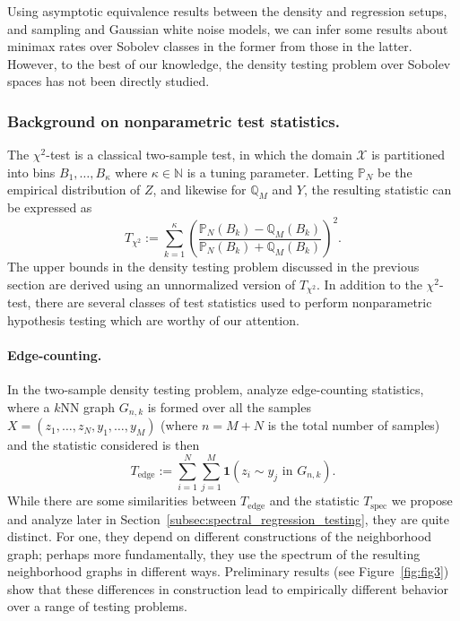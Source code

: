 \documentclass{article}
\newcommand{\1}{\mathbf{1}}
\theoremstyle{alden}
\theoremstyle{aldenthm}
\theoremstyle{definition}
\theoremstyle{remark}
\begin{document}
Using asymptotic equivalence results \citet{reiss08,nussbaum96,brown96} between the density and regression setups, and sampling and Gaussian white noise models, we can infer some results about minimax rates over Sobolev classes in the former from those in the latter. However, to the best of our knowledge, the density testing problem over Sobolev spaces has not been directly studied.

\subsubsection{Background on nonparametric test statistics.}

The $\chi^2$-test is a classical two-sample test, in which the domain $\mathcal{X}$ is partitioned into bins $B_1,\ldots,B_\kappa$ where $\kappa \in \mathbb{N}$ is a tuning parameter. Letting $\mathbb{P}_N$ be the empirical distribution of $Z$, and likewise for $\mathbb{Q}_M$ and $Y$, the resulting statistic can be expressed as 
\begin{equation}
\label{eqn:chi_squared}
T_{\chi^2} := \sum_{k = 1}^{\kappa} \left(\frac{\mathbb{P}_N(B_k) - \mathbb{Q}_M(B_k)}{\mathbb{P}_N(B_k) + \mathbb{Q}_M(B_k)}\right)^2.
\end{equation}
The upper bounds in the density testing problem discussed in the previous section are derived using an unnormalized version of $T_{\chi^2}$. In addition to the $\chi^2$-test, there are several classes of test statistics used to perform nonparametric hypothesis testing which are worthy of our attention.

\paragraph{Edge-counting.}
In the two-sample density testing problem, \citet{schilling86, bhattacharya15} analyze edge-counting statistics, where a $k$NN graph $G_{n,k}$ is formed over all the samples $X = (z_1,\ldots,z_N,y_1,\ldots,y_M)$ (where $n = M + N$ is the total number of samples) and the statistic considered is then
\begin{equation}
\label{eqn:edge_count_statistic}
T_{\textrm{edge}} := \sum_{i = 1}^{N} \sum_{j = 1}^{M} \1(z_i \sim y_j \textrm{ in } G_{n,k}).
\end{equation}
While there are some similarities between $T_{\mathrm{edge}}$ and the statistic $T_{\mathrm{spec}}$ we propose and analyze later in Section~\ref{subsec:spectral_regression_testing}, they are quite distinct. For one, they depend on different constructions of the neighborhood graph; perhaps more fundamentally, they use the spectrum of the resulting neighborhood graphs in different ways. Preliminary results (see Figure~\ref{fig:fig3}) show that these differences in construction lead to empirically different behavior over a range of testing problems.
\end{document}
